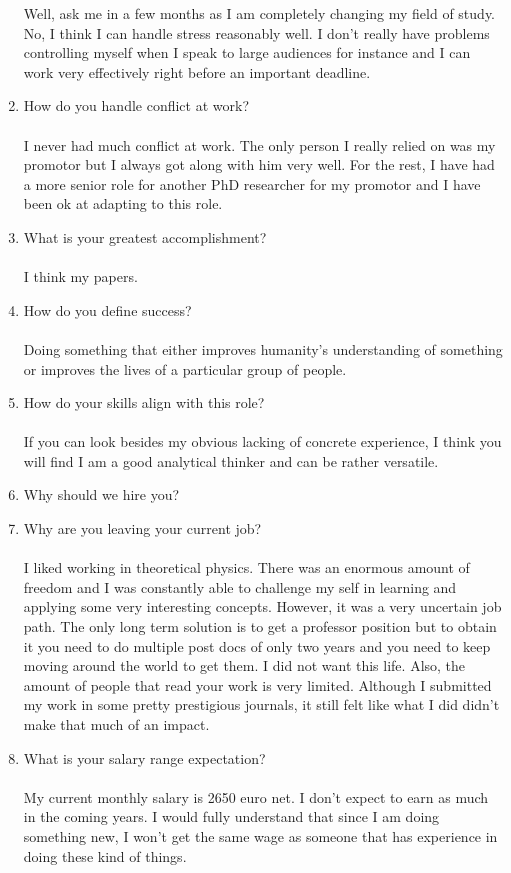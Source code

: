 \documentclass[12pt,a4paper,twoside]{article}
\begin{document}
\begin{enumerate}
		Well, ask me in a few months as I am completely changing my field of study. No, I think I can handle stress reasonably well. I don't really have problems controlling myself when I speak to large audiences for instance and I can work very effectively right before an important deadline.
		\item How do you handle conflict at work?\\\\
		I never had much conflict at work. The only person I really relied on was my promotor but I always got along with him very well. For the rest, I have had a more senior role for another PhD researcher for my promotor and I have been ok at adapting to this role.
		\item What is your greatest accomplishment?\\\\
		I think my papers.
		\item How do you define success?\\\\
		Doing something that either improves humanity's understanding of something or improves the lives of a particular group of people.
		\item How do your skills align with this role?\\\\
		If you can look besides my obvious lacking of concrete experience, I think you will find I am a good analytical thinker and can be rather versatile.
		\item Why should we hire you?
		\item Why are you leaving your current job?\\\\
		I liked working in theoretical physics. There was an enormous amount of freedom and I was constantly able to challenge my self in learning and applying some very interesting concepts. However, it was a very uncertain job path. The only long term solution is to get a professor position but to obtain it you need to do multiple post docs of only two years and you need to keep moving around the world to get them. I did not want this life. Also, the amount of people that read your work is very limited. Although I submitted my work in some pretty prestigious journals, it still felt like what I did didn't make that much of an impact.
		\item What is your salary range expectation?\\\\
		My current monthly salary is 2650 euro net. I don't expect to earn as much in the coming years. I would fully understand that since I am doing something new, I won't get the same wage as someone that has experience in doing these kind of things.

\end{enumerate}
\end{document}
